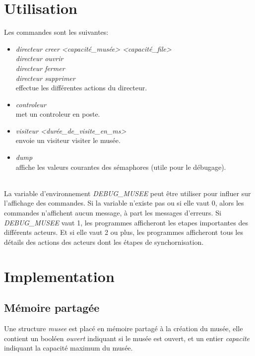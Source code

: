 \documentclass[a4paper,12pt,DIV=16]{scrreprt}
\begin{document}
    \section*{Utilisation}

    Les commandes sont les suivantes:
    \begin{itemize}
        \item \textit{directeur creer <capacité\_musée> <capacité\_file>}\\
            \textit{directeur ouvrir}\\
            \textit{directeur fermer}\\
            \textit{directeur supprimer}\\
             effectue les différentes actions du directeur.
        \item \textit{controleur}\\
            met un controleur en poste.
        \item \textit{visiteur <durée\_de\_visite\_en\_ms>}\\
            envoie un visiteur visiter le musée.
        \item \textit{dump}\\
            affiche les valeurs courantes des sémaphores (utile pour le débugage).
    \end{itemize}

     \\

    La variable d'environnement \emph{DEBUG\_MUSEE} peut être utiliser pour influer sur l'affichage
    des commandes. Si la variable n'existe pas ou si elle vaut 0, alors les commandes n'affichent
    aucun message, à part les messages d'erreurs. Si \emph{DEBUG\_MUSEE} vaut 1, les programmes
    afficheront les etapes importantes des différents acteurs. Et si elle vaut 2 ou plus,
    les programmes afficheront tous les détails des actions des acteurs dont les étapes de synchornisation.

    \section*{Implementation}


    \subsection*{Mémoire partagée}

    Une structure \emph{musee} est placé en mémoire partagé à la création du musée, elle contient
    un booléen \emph{ouvert} indiquant si le musée est ouvert, et un entier \emph{capacite} indiquant
    la capacité maximum du musée.
\end{document}
